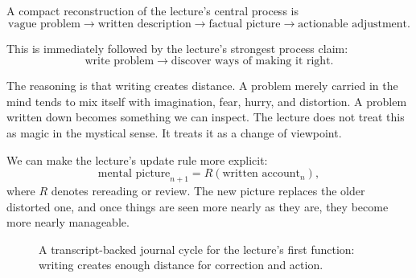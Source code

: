 A compact reconstruction of the lecture's central process is
\begin{equation}
\text{vague problem}\rightarrow \text{written description}\rightarrow \text{factual picture}\rightarrow \text{actionable adjustment}.
\end{equation}

This is immediately followed by the lecture's strongest process claim:
\begin{equation}
\text{write problem}\rightarrow \text{discover ways of making it right}.
\end{equation}

The reasoning is that writing creates distance. A problem merely carried in the mind tends to mix itself with imagination, fear, hurry, and distortion. A problem written down becomes something we can inspect. The lecture does not treat this as magic in the mystical sense. It treats it as a change of viewpoint.

We can make the lecture's update rule more explicit:
\begin{equation}
\text{mental picture}_{n+1}=R\!\left(\text{written account}_{n}\right),
\end{equation}
where \(R\) denotes rereading or review. The new picture replaces the older distorted one, and once things are seen more nearly as they are, they become more nearly manageable.

\begin{figure}[h]
\centering
{}
\caption{A transcript-backed journal cycle for the lecture's first function: writing creates enough distance for correction and action.}
\end{figure}

